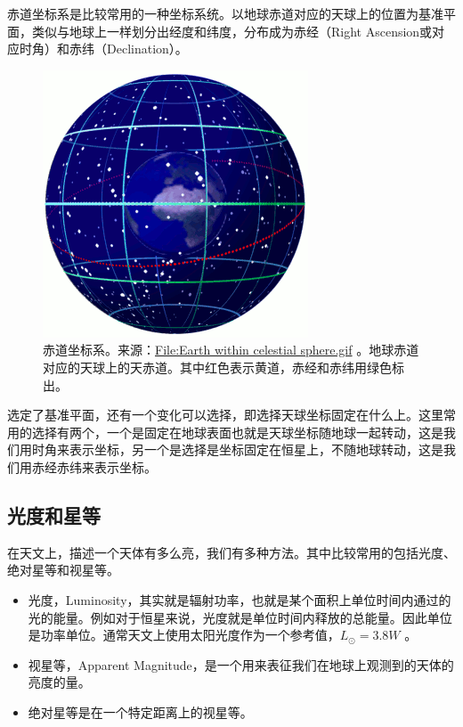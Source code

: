 \documentclass[letterpaper,10pt,english]{sphinxmanual}
\begin{document}
赤道坐标系是比较常用的一种坐标系统。以地球赤道对应的天球上的位置为基准平面，类似与地球上一样划分出经度和纬度，分布成为赤经（Right Ascension或对应时角）和赤纬（Declination）。
\begin{figure}[htbp]
\centering
\capstart

\includegraphics{earth_within_celestial_sphere.gif}
\caption{赤道坐标系。来源：\href{https://commons.wikimedia.org/wiki/File:Earth\_within\_celestial\_sphere.gif}{File:Earth within celestial sphere.gif} 。地球赤道对应的天球上的天赤道。其中红色表示黄道，赤经和赤纬用绿色标出。}\end{figure}

选定了基准平面，还有一个变化可以选择，即选择天球坐标固定在什么上。这里常用的选择有两个，一个是固定在地球表面也就是天球坐标随地球一起转动，这是我们用时角来表示坐标，另一个是选择是坐标固定在恒星上，不随地球转动，这是我们用赤经赤纬来表示坐标。


\subsection{光度和星等}
\label{orbits:index-5}\label{orbits:id3}
在天文上，描述一个天体有多么亮，我们有多种方法。其中比较常用的包括光度、绝对星等和视星等。
\begin{itemize}
\item {} 
光度，Luminosity，其实就是辐射功率，也就是某个面积上单位时间内通过的光的能量。例如对于恒星来说，光度就是单位时间内释放的总能量。因此单位是功率单位。通常天文上使用太阳光度作为一个参考值，\(L_{\odot} = 3.8 W\) 。

\item {} 
视星等，Apparent Magnitude，是一个用来表征我们在地球上观测到的天体的亮度的量。

\item {} 
绝对星等是在一个特定距离上的视星等。

\end{itemize}
\end{document}
